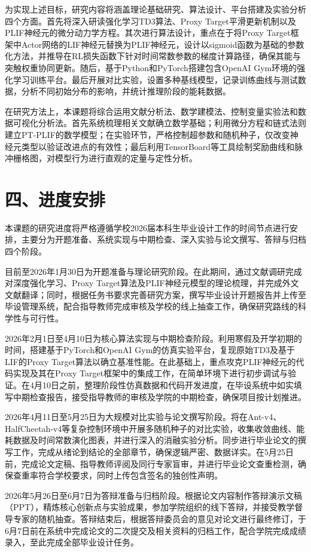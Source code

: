 \documentclass[UTF8,12pt,a4paper]{ctexart}
\begin{document}
为实现上述目标，研究内容将涵盖理论基础研究、算法设计、平台搭建及实验分析四个方面。首先将深入研读强化学习TD3算法、Proxy Target平滑更新机制以及PLIF神经元的微分动力学方程。其次进行算法设计，重点在于将Proxy Target框架中Actor网络的LIF神经元替换为PLIF神经元，设计以sigmoid函数为基础的参数化方法，并推导在RL损失函数下针对时间常数参数的梯度计算路径，确保其能与突触权重协同更新。随后，基于Python和PyTorch搭建包含OpenAI Gym环境的强化学习训练平台。最后开展对比实验，设置多种基线模型，记录训练曲线与测试数据，分析不同初始分布的影响，并统计推理阶段的能耗数据。

在研究方法上，本课题将综合运用文献分析法、数学建模法、控制变量实验法和数据可视化分析法。首先系统梳理相关文献确立数学基础；利用微分方程和链式法则建立PT-PLIF的数学模型；在实验环节，严格控制超参数和随机种子，仅改变神经元类型以验证改进点的有效性；最后利用TensorBoard等工具绘制奖励曲线和脉冲栅格图，对模型行为进行直观的定量与定性分析。

\section*{四、进度安排}
本课题的研究进度将严格遵循学校2026届本科生毕业设计工作的时间节点进行安排，主要分为开题准备、系统实现与中期检查、深入实验与论文撰写、答辩与归档四个阶段。

目前至2026年1月30日为开题准备与理论研究阶段。在此期间，通过文献调研完成对深度强化学习、Proxy Target算法及PLIF神经元模型的理论梳理，并完成外文文献翻译；同时，根据任务书要求完善研究方案，撰写毕业设计开题报告并上传至毕设管理系统，配合指导教师完成审核及学校的线上抽查工作，确保研究路线的科学性与可行性。

2026年2月1日至4月10日为核心算法实现与中期检查阶段。利用寒假及开学初期的时间，搭建基于PyTorch和OpenAI Gym的仿真实验平台，复现原始TD3及基于LIF的Proxy Target算法以确立基准性能。在此基础上，重点攻克PLIF神经元的代码实现及其在Proxy Target框架中的集成工作，在简单环境下进行初步调试与验证。在4月10日之前，整理阶段性仿真数据和代码开发进度，在毕设系统中如实填写中期检查报告，接受指导教师的审核及学院的中期检查，确保项目按计划推进。

2026年4月11日至5月25日为大规模对比实验与论文撰写阶段。将在Ant-v4、HalfCheetah-v4等复杂控制环境中开展多随机种子的对比实验，收集收敛曲线、能耗数据及时间常数演化图表，并进行深入的消融实验分析。同步进行毕业论文的撰写工作，完成从绪论到结论的全部章节，确保逻辑严密、数据详实。在5月25日前，完成论文定稿、指导教师评阅及同行专家盲审，并进行毕业论文查重检测，确保查重率符合学校要求，同时上传包含签名的独创性声明。

2026年5月26日至6月7日为答辩准备与归档阶段。根据论文内容制作答辩演示文稿（PPT），精炼核心创新点与实验成果，参加学院组织的线下答辩，并接受教学督导专家的随机抽查。答辩结束后，根据答辩委员会的意见对论文进行最终修订，于6月7日前在系统中完成论文的二次提交及相关资料的归档工作，配合学院完成成绩录入，至此完成全部毕业设计任务。
\end{document}
